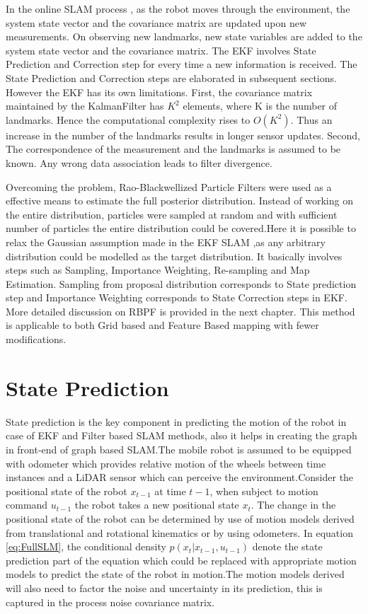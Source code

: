 In the online SLAM process , as the robot moves through the environment, the system state vector and the covariance matrix are updated upon new measurements. 
On observing new landmarks, new state variables are added to the system state vector and the covariance matrix. The EKF involves State Prediction and Correction step for every time a new information is received. The State Prediction and Correction steps are elaborated in subsequent sections. However the EKF has its own limitations. First, the covariance matrix maintained by the KalmanFilter has $K^2$ elements, where K is the number of landmarks. Hence the computational complexity rises to ${O}(K^2)$. Thus an increase in the number of the landmarks results in longer sensor updates. Second, The correspondence of the measurement and the landmarks is assumed to be known. Any wrong data association leads to filter divergence.  \par
Overcoming the problem, Rao-Blackwellized Particle Filters were used as a effective means to estimate the full posterior distribution. Instead of working on the entire distribution, particles were sampled at random and with sufficient number of particles the entire distribution could be covered.Here it is possible to relax the Gaussian assumption made in the EKF SLAM ,as any arbitrary distribution could be modelled as the target distribution. It basically involves steps such as Sampling, Importance Weighting, Re-sampling and Map Estimation. Sampling from proposal distribution corresponds to State prediction step and Importance Weighting corresponds to State Correction steps in EKF.
More detailed discussion on RBPF is provided in the next chapter. This method is applicable to both Grid based and Feature Based mapping with fewer modifications.\par


\section{State Prediction}
State prediction is the key component in predicting the motion of the robot in case of EKF and Filter based SLAM methods, also it helps in creating the graph in front-end of graph based SLAM.The mobile robot is assumed to be equipped with odometer which provides relative motion of the wheels between time instances and a LiDAR sensor which can perceive the environment.Consider the positional state of the robot $x_{t-1}$ at time $t-1$, when subject to motion command $u_{t-1}$ the robot takes a new positional state $x_t$. The change in the positional state of the robot can be determined by use of motion models derived from translational and rotational kinematics or by using odometers. In equation \ref{eq:FullSLM}, the conditional density $p(x_t| x_{t-1}, u_{t-1})$ denote the state prediction part of the equation which could be replaced with appropriate motion models to predict the state of the robot in motion.The motion models derived will also need to factor the noise and uncertainty in its prediction, this is captured in the process noise covariance matrix. 

